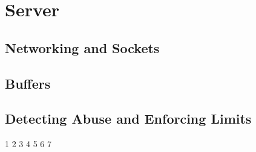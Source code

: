 \section{Server}

\subsection{Networking and Sockets}

\subsection{Buffers}

\subsection{Detecting Abuse and Enforcing Limits}
1
2
3
4
5
6
7
